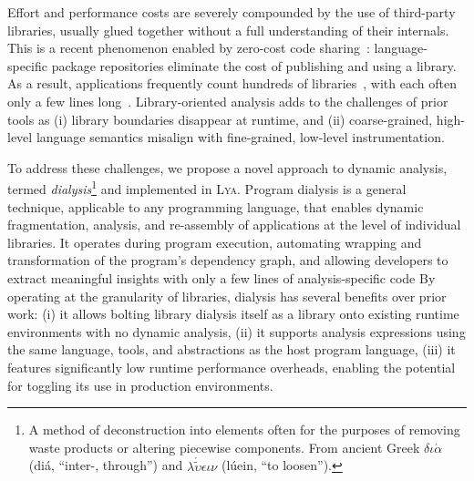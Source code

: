 \documentclass[letterpaper,twocolumn,10pt]{article}
\newcommand{\sys}{{\scshape Lya}\xspace}
\begin{document}
Effort and performance costs are severely compounded by the use of third-party libraries, usually glued together without a full understanding of their internals.
This is a recent phenomenon enabled by zero-cost code sharing~\cite{libs}:
  language-specific package repositories eliminate the cost of publishing and using a library.
As a result, applications frequently count hundreds of libraries~\cite{npmstudy:19}, with each often only a few lines long~\cite{leftpad, npmstudy:19}. %
Library-oriented analysis adds to the challenges of prior tools as
  (i) library boundaries disappear at runtime, and
  (ii) coarse-grained, high-level language semantics misalign with fine-grained, low-level instrumentation.

To address these challenges, we propose a novel approach to dynamic analysis, termed \emph{dialysis}\footnote{
  A method of deconstruction into elements often for the purposes of removing waste products or altering piecewise components.
  From ancient Greek {\scriptsize $\delta\iota\acute{\alpha}$} (di\'{a}, ``inter-, through'') and {\scriptsize $\lambda\acute{\tilde{\upsilon}}\epsilon\iota\nu$} (lúein, ``to loosen'').
} and implemented in \sys.
Program dialysis is a general technique, applicable to any programming language, that enables dynamic fragmentation, analysis, and re-assembly of applications at the level of individual libraries. 
It operates during program execution, automating wrapping and transformation of the program's dependency graph, and allowing developers to extract meaningful insights with only a few lines of analysis-specific code
By operating at the granularity of libraries, dialysis has several benefits over prior work: %
  (i) it allows bolting library dialysis itself as a library onto existing runtime environments with no dynamic analysis,
  (ii) it supports analysis expressions using the same language, tools, and abstractions as the host program language,
  (iii) it features significantly low runtime performance overheads, enabling the potential for toggling its use in production environments.
\end{document}
